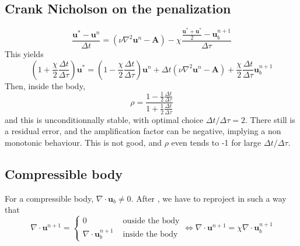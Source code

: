 \documentclass[12pt, openany]{report}
\theoremstyle{definition}
\begin{document}
\subsection{Crank Nicholson on the penalization}
\begin{equation}
	\frac{\boldsymbol{u}^* - \boldsymbol{u}^n}{\Delta t} = (\nu \nabla^2 \boldsymbol{u}^n-\boldsymbol{A}) - \chi \frac{\frac{\boldsymbol{u}^* + \boldsymbol{u}^*}{2}-\boldsymbol{u}_b^{n+1}}{\Delta \tau}
\end{equation}
This yields 
\begin{equation}
	\left(1+\frac{\chi}{2}\frac{\Delta t}{\Delta \tau}\right) \boldsymbol{u}^* = \left(1-\frac{\chi}{2}\frac{\Delta t}{\Delta \tau}\right)\boldsymbol{u}^n + \Delta t(\nu \nabla^2 \boldsymbol{u}^n-\boldsymbol{A}) + \frac{\chi}{2}\frac{\Delta t}{\Delta \tau} \boldsymbol{u}_b^{n+1}
\end{equation}
Then, inside the body, 
\begin{equation}
	\rho = \frac{1-\frac{1}{2}\frac{\Delta t}{\Delta \tau}}{1+\frac{1}{2}\frac{\Delta t}{\Delta \tau}}
\end{equation}
and this is unconditionnally stable, with optimal choice $\Delta t/\Delta \tau=2$. There still is a residual error, and the amplification factor can be negative, implying a non monotonic behaviour. This is not good, and $\rho$ even tends to -1 for large $\Delta t/\Delta \tau$. 
\subsection{Compressible body}
For a compressible body, $\nabla \cdot \boldsymbol{u}_b\neq 0$. After , we have to reproject in such a way that 
\begin{equation}
	\nabla \cdot \boldsymbol{u}^{n+1} = 
	\begin{cases}
		0 &\text{ ouside the body}\\
		\nabla \cdot \boldsymbol{u}^{n+1}_b &\text{ inside the body}
	\end{cases} \Longleftrightarrow \nabla \cdot \boldsymbol{u}^{n+1} = \chi \nabla \cdot \boldsymbol{u}_b^{n+1}
\end{equation}
\end{document}
